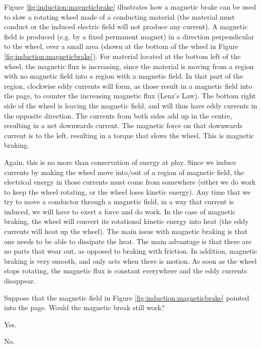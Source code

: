 Figure \ref{fig:induction:magneticbrake} illustrates how a magnetic brake can be used to slow a rotating wheel made of a conducting material (the material must conduct or the induced electric field will not produce any current). A magnetic field is produced (e.g. by a fixed permanent magnet) in a direction perpendicular to the wheel, over a small area (shown at the bottom of the wheel in Figure \ref{fig:induction:magneticbrake}).
For material located at the bottom left of the wheel, the magnetic flux is increasing, since the material is moving from a region with no magnetic field into a region with a magnetic field. In that part of the region, clockwise eddy currents will form, as those result in a magnetic field into the page, to counter the increasing magnetic flux (Lenz's Law). The bottom right side of the wheel is leaving the magnetic field, and will thus have eddy currents in the opposite direction. The currents from both sides add up in the centre, resulting in a net downwards current. The magnetic force on that downwards current is to the left, resulting in a torque that slows the wheel. This is magnetic braking.

Again, this is no more than conservation of energy at play. Since we induce currents by making the wheel move into/out of a region of magnetic field, the electrical energy in those currents must come from somewhere (either we do work to keep the wheel rotating, or the wheel loses kinetic energy). Any time that we try to move a conductor through a magnetic field, in a way that current is induced, we will have to exert a force and do work. In the case of magnetic braking, the wheel will convert its rotational kinetic energy into heat (the eddy currents will heat up the wheel). The main issue with magnetic braking is that one needs to be able to dissipate the heat. The main advantage is that there are no parts that wear out, as opposed to braking with friction. In addition, magnetic braking is very smooth, and only acts when there is motion. As soon as the wheel stops rotating, the magnetic flux is constant everywhere and the eddy currents disappear.

\begin{checkpoint}{}
	\begin{MCquestion}{Suppose that the magnetic field in Figure \ref{fig:induction:magneticbrake} pointed into the page. Would the magnetic break still work?}
		\item Yes. \correct
		\item No.
	\end{MCquestion}
\end{checkpoint}

